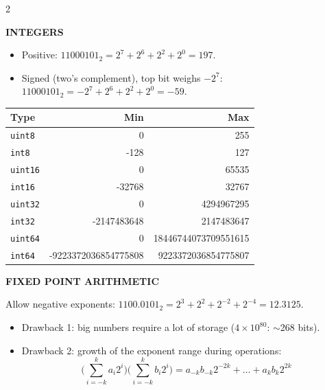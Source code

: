 \documentclass[a4paper,9pt]{extarticle}
\begin{document}
\begin{multicols}{2}
\begin{definition}

\textbf{INTEGERS}

\begin{itemize}

\item Positive: $11000101_2 = 2^7 + 2^6 + 2^2 + 2^0 = 197$.

\item Signed (two's complement), top bit weighs $-2^7$:
$11000101_2 = -2^7 + 2^6 + 2^2 + 2^0 = -59$.

\end{itemize}

\end{definition}


\begin{center}
\small
\begin{tabular}{l|rr}
Type & Min & Max \\
\hline
\texttt{uint8} & 0 & 255 \\
\texttt{int8} & -128 & 127 \\
\texttt{uint16} & 0 & 65535 \\
\texttt{int16} & -32768 & 32767 \\
\texttt{uint32} & 0 & 4294967295 \\
\texttt{int32} & -2147483648 & 2147483647 \\
\texttt{uint64} & 0 & 18446744073709551615 \\
\texttt{int64} & -9223372036854775808 & 9223372036854775807 \\
\end{tabular}
\end{center}


\begin{definition}

\textbf{FIXED POINT ARITHMETIC}

Allow negative exponents: $1100.0101_2 = 2^3 + 2^2 + 2^{-2} + 2^{-4} = 12.3125$.

\end{definition}


\begin{warning}

\begin{itemize}

\item Drawback 1: big numbers require a lot of storage ($4 \times 10^{80}$: $\sim$268 bits).

\item Drawback 2: growth of the exponent range during operations:
\[
\Big(\sum_{i=-k}^{k} a_i 2^i\Big)\Big(\sum_{i=-k}^{k} b_i 2^i\Big)
= a_{-k}b_{-k}2^{-2k} + \dots + a_k b_k 2^{2k}
\]


\end{itemize}
\end{warning}
\end{multicols}
\end{document}
